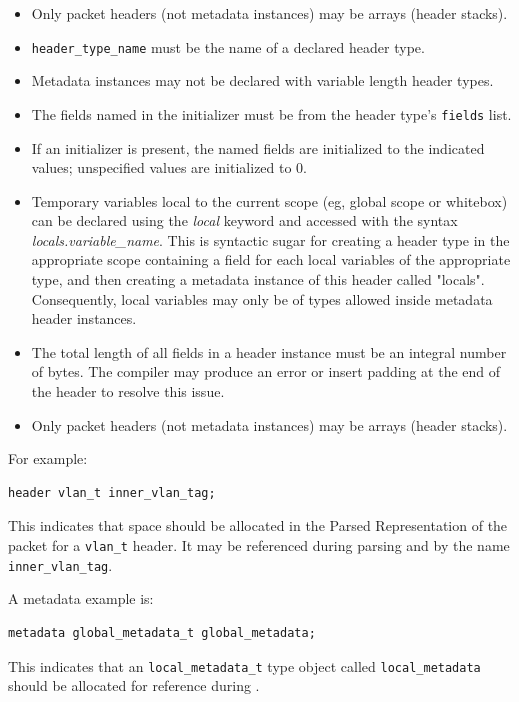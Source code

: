 \documentclass[12pt]{article}
\begin{document}
\begin{itemize}
\item
Only packet headers (not metadata instances) may be arrays (header stacks).
\item
\texttt{header_type_name} must be the name of a declared header type.
\item
Metadata instances may not be declared with variable length header types.
\item
The fields named in the initializer must be from the header type's \texttt{fields} list.
\item
If an initializer is present, the named fields are initialized to the indicated 
values; unspecified values are initialized to 0.
\item
Temporary variables local to the current scope (eg, global scope or whitebox)
can be declared using the \textit{local} keyword and accessed with the syntax
\mbox{\textit{locals.variable_name}}. This is syntactic sugar for creating a
header type in the appropriate scope containing a field for each local variables
of the appropriate type, and then creating a metadata instance of this header
called "locals". Consequently, local variables may only be of types allowed
inside metadata header instances.
\item
The total length of all fields in a header instance must be an integral number
of bytes. The compiler may produce an error or insert padding at the end of
the header to resolve this issue.
\item
Only packet headers (not metadata instances) may be arrays (header stacks).
\end{itemize}


For example:

\begin{lstlisting}[style=P4style]
header vlan_t inner_vlan_tag;
\end{lstlisting}

This indicates that space should be allocated in the Parsed
Representation of the packet for a \texttt{vlan_t} header. It may be
referenced during parsing and \matchaction by the name
\texttt{inner_vlan_tag}.

A metadata example is:

\begin{lstlisting}[style=P4style]
metadata global_metadata_t global_metadata;
\end{lstlisting}

This indicates that an \texttt{local_metadata_t} type object called
\texttt{local_metadata} should be allocated for reference during
\matchaction.  
\end{document}
